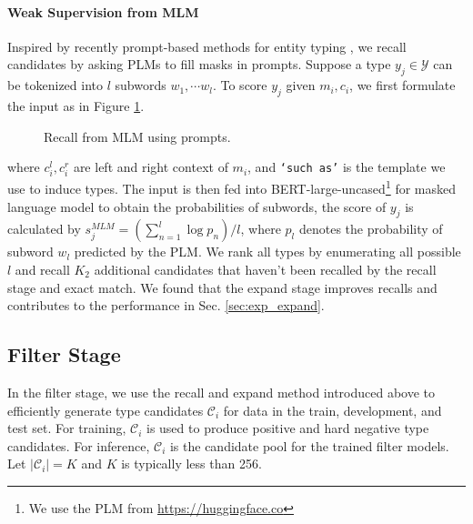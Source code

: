 \paragraph{Weak Supervision from MLM} Inspired by recently prompt-based methods for entity typing \cite{ding2021prompt, dfet}, we recall candidates by asking PLMs to fill masks in prompts. Suppose a type $y_j \in \mathcal{Y}$ can be tokenized into $l$ subwords $w_1, \cdots w_l$. To score $y_j$ given $m_i, c_i$, we first formulate the input as in Figure \ref{fig:prompt_recall}.
\begin{figure}[h]
    \centering
    \caption{Recall from MLM using prompts.}
    \label{fig:prompt_recall}
\end{figure}
where $c_i^l, c_i^r$ are left and right context of $m_i$, and \texttt{`such as'} is the template we use to induce types. The input is then fed into BERT-large-uncased\footnote{We use the PLM from \url{https://huggingface.co}} for masked language model to obtain the probabilities of subwords, the score of $y_j$ is calculated by $ s^{MLM}_{j} = (\sum_{n=1}^l \log p_n)/l$, where $p_l$ denotes the probability of subword $w_l$ predicted by the PLM. We rank all types by enumerating all possible $l$ and recall $K_2$ additional candidates that haven't been recalled by the recall stage and exact match. We found that the expand stage improves recalls and contributes to the performance in Sec. \ref{sec:exp_expand}.
\subsection{Filter Stage}
In the filter stage, we use the recall and expand method introduced above to efficiently generate type candidates $\mathcal{C}_i$ for data in the train, development, and test set. For training, $\mathcal{C}_i$ is used to produce positive and hard negative type candidates. For inference, $\mathcal{C}_i$ is the candidate pool for the trained filter models. Let $|\mathcal{C}_i|=K$ and $K$ is typically less than 256. 
